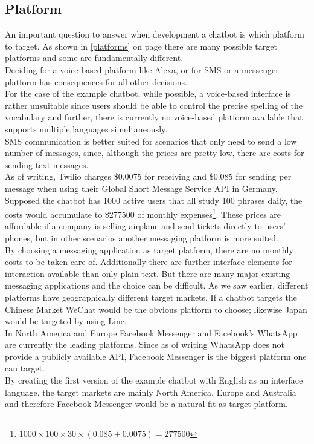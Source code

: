\subsection{Platform}

An important question to answer when development a chatbot is which platform to target.
As shown in \ref{platforms} on page \pageref{platforms} there are many possible target platforms
and some are fundamentally different.
\\

Deciding for a voice-based platform like Alexa, or for SMS or a messenger platform has consequences
for all other decisions.
\\
For the case of the example chatbot, while possible, a voice-based interface is rather unsuitable since
users should be able to control the precise spelling of the vocabulary
and further, there is currently no voice-based platform available
that supports multiple languages simultaneously.
\\

SMS communication is better suited for scenarios that only need to send a low number of messages,
since, although the prices are pretty low, there are costs for sending text messages.
\\
As of writing, Twilio charges \$0.0075 for receiving and \$0.085 for sending per message when using their Global Short Message Service API in Germany\cite{twilio}.
\\
Supposed the chatbot has 1000 active users that all study 100 phrases daily,
the costs would accumulate to \$277500 of monthly expenses\footnote{$1000\times100\times30\times(0.085+0.0075)=277500$}.
These prices are affordable if a company is selling airplane and send tickets directly to users' phones,
but in other scenarios another messaging platform is more suited.
\\

By choosing a messaging application as target platform, there are no monthly costs to be taken care of.
Additionally there are further interface elements for interaction available than only plain text.
But there are many major existing messaging applications and the choice can be difficult.
As we saw earlier, different platforms have geographically different target markets.
If a chatbot targets the Chinese Market WeChat would be the obvious platform to choose;
likewise Japan would be targeted by using Line.
\\
In North America and Europe Facebook Messenger and Facebook's WhatsApp are currently the leading platforms.
Since as of writing WhatsApp does not provide a publicly available API, Facebook Messenger is the biggest platform one can target.
\\
By creating the first version of the example chatbot with English as an interface language,
the target markets are mainly North America, Europe and Australia and therefore Facebook Messenger would be a natural fit as target platform.
\\

